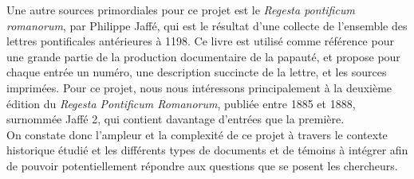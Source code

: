 Une autre sources primordiales pour ce projet est le \textit{Regesta pontificum romanorum}, par Philippe Jaffé, qui est le résultat d’une collecte de l’ensemble des lettres pontificales antérieures à 1198. Ce livre est utilisé comme référence pour une grande partie de la production documentaire de la papauté, et propose pour chaque entrée un numéro, une description succincte de la lettre, et les sources imprimées. Pour ce projet, nous nous intéressons principalement à la deuxième édition du \textit{Regesta Pontificum Romanorum}, publiée entre 1885 et 1888, surnommée Jaffé 2, qui contient davantage d’entrées que la première.\\
On constate donc l’ampleur et la complexité de ce projet à travers le contexte historique étudié et les différents types de documents et de témoins à intégrer afin de pouvoir potentiellement répondre aux questions que se posent les chercheurs. 



 
    


